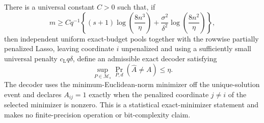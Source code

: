 There is a universal constant \(C>0\) such that, if
\[
 m\ge Cq^{-1}\left\{(s+1)\log\!\left(\frac{8n^3}{\eta}\right)
 +\frac{\sigma^2}{\delta^2}\log\!\left(\frac{8n^2}{\eta}\right)\right\},
\]
then independent uniform exact-budget pools together with the rowwise partially penalized Lasso, leaving coordinate \(i\) unpenalized and using a sufficiently small universal penalty \(c_{\mathrm L}q\delta\), define an admissible exact decoder satisfying
\[
 \sup_{P\in\mathcal M_s}\Pr_{P,d}(\widehat A\ne A)\le\eta.
\]
The decoder uses the minimum-Euclidean-norm minimizer off the unique-solution event and declares \(A_{ij}=1\) exactly when the penalized coordinate \(j\ne i\) of the selected minimizer is nonzero.  This is a statistical exact-minimizer statement and makes no finite-precision operation or bit-complexity claim.